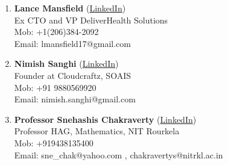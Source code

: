 \documentclass[11pt,a4paper]{article} %
\begin{document}
\begin{enumerate}
	\item {\noindent {} {\textbf{Lance Mansfield}}
                (\href{https://www.linkedin.com/in/lancemansfield/}{LinkedIn}) \\
				{Ex CTO and VP DeliverHealth Solutions} \\
				{Mob: +1(206)384-2092} \\
				{Email: lmansfield17@gmail.com}}
	\item {\noindent {} {\textbf{Nimish Sanghi}}
				(\href{https://www.linkedin.com/in/nsanghi/}{LinkedIn}) \\
                {Founder at Cloudcraftz, SOAIS} \\
				{Mob: +91 9880569920} \\
				{Email: nimish.sanghi@gmail.com}}
	\item {\noindent {} {\textbf{Professor Snehashis Chakraverty}}
                (\href{https://www.linkedin.com/in/snehashish-chakraverty-97618432/}{LinkedIn}) \\
				{Professor HAG, Mathematics, NIT Rourkela} \\
				{Mob: +919438135400} \\
				{Email: sne\_chak@yahoo.com , chakravertys@nitrkl.ac.in}}
	

\end{enumerate}

\end{document}
